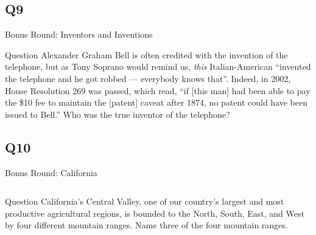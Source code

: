 \documentclass[11pt]{beamer}
\begin{document}
\subsection*{Q9}
\begin{frame}[t]{Bonus Round: Inventors and Inventions}
\begin{block}{Question}
Alexander Graham Bell is often credited with the invention of the telephone, but as Tony Soprano would remind us, \emph{this} Italian-American ``invented the telephone and he got robbed --- everybody knows that''. Indeed, in 2002, House Resolution 269 was passed, which read, ``if [this man] had been able to pay the \$10 fee to maintain the [patent] caveat after 1874, no patent could have been issued to Bell.'' Who was the true inventor of the telephone?
\end{block}
\end{frame}
\subsection*{Q10}
\begin{frame}[t]{Bonus Round: California}
\begin{columns}[T,totalwidth=\linewidth]
\begin{column}{0.7\linewidth}
\begin{block}{Question}
California's Central Valley, one of our country's largest and most productive agricultural regions, is bounded to the North, South, East, and West by four different mountain ranges. Name three of the four mountain ranges.
\end{block}
\end{column}
\begin{column}{0.25\linewidth}
\begin{center}
\texttt{[image: \{Images/calitopomap]}.jpg}
\end{center}
\end{column}
\end{columns}
\end{frame}
\end{document}
